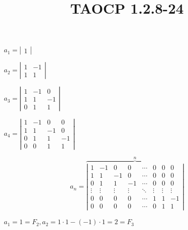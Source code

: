 \documentclass{article}
\title{TAOCP 1.2.8\mbox{-}24}
\begin{document}
\maketitle

\( a_{1} = \left|\begin{matrix}1\end{matrix}\right| \)

\( a_{2} = \left|\begin{matrix}1 & -1 \\ 1 & 1\end{matrix}\right| \)

\( a_{3} = \left|\begin{matrix}1 & -1 & 0 \\ 1 & 1 & -1 \\ 0 & 1 & 1\end{matrix}\right| \)

\( a_{4} = \left|\begin{matrix}1 & -1 & 0 & 0\\ 1 & 1 & -1 & 0\\ 0 & 1 & 1 & -1 \\ 0 & 0 & 1 & 1\end{matrix}\right| \)

\[ a_{n} = \overbrace{\left|\begin{matrix}1 & -1 & 0 & 0 & \cdots & 0 & 0 & 0 \\ 1 & 1 & -1 & 0 & \cdots & 0 & 0 & 0 \\ 0 & 1 & 1 & -1 & \cdots & 0 & 0 & 0 \\ \vdots & \vdots & \vdots & \vdots & \ddots & \vdots & \vdots & \vdots \\ 0 & 0 & 0 & 0 & \cdots & 1 & 1 & -1 \\ 0 & 0 & 0 & 0 & \cdots & 0 & 1 & 1\end{matrix}\right|}^{n} \]

\( a_{1} = 1 = F_{2}, a_{2} = 1 \cdot 1 - (-1) \cdot 1 = 2 = F_{3} \)
\end{document}
